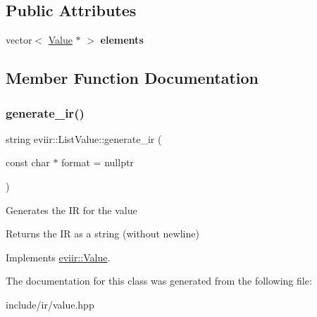 \subsection*{Public Attributes}
\begin{DoxyCompactItemize}
\item 
\mbox{\label{classeviir_1_1ListValue_a5bc8c31cf9ca0b62bc02edd6215c7612}} 
vector$<$ \hyperlink{classeviir_1_1Value}{Value} $\ast$ $>$ {\bfseries elements}
\end{DoxyCompactItemize}


\subsection{Member Function Documentation}
\mbox{\label{classeviir_1_1ListValue_ad12dee3774ad443ad0e27354909e8dc9}} 
\subsubsection{\texorpdfstring{generate\+\_\+ir()}{generate\_ir()}}
{\footnotesize\ttfamily string eviir\+::\+List\+Value\+::generate\+\_\+ir (\begin{DoxyParamCaption}\item[{const char $\ast$}]{format = {\ttfamily nullptr} }\end{DoxyParamCaption})\hspace{0.3cm}{\ttfamily [virtual]}}

Generates the IR for the value \begin{DoxyReturn}{Returns}
the IR as a string (without newline) 
\end{DoxyReturn}


Implements \hyperlink{classeviir_1_1Value_a0613bf660425df31e230681555f64dea}{eviir\+::\+Value}.



The documentation for this class was generated from the following file\+:\begin{DoxyCompactItemize}
\item 
include/ir/value.\+hpp\end{DoxyCompactItemize}
